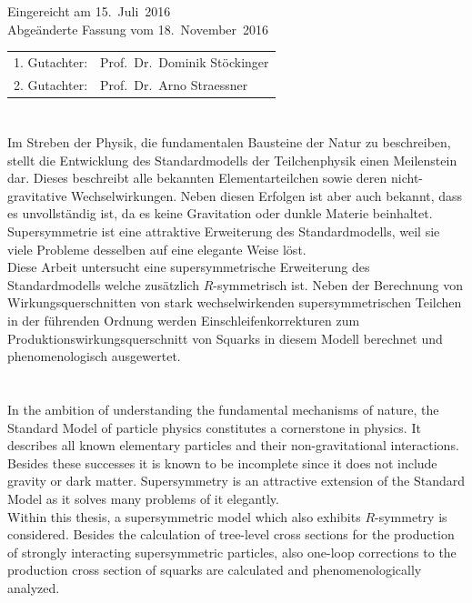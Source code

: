 \thispagestyle{empty}\vspace*{48em}
Eingereicht am 15.~Juli~2016\\
Abgeänderte Fassung vom 18.~November~2016\vspace{1.5em}
\par{\large\begin{tabular}{ll}
 1. Gutachter: & Prof.~Dr.~Dominik Stöckinger \\
 2. Gutachter: & Prof.~Dr.~Arno Straessner \\
\end{tabular}}
\newpage

\thispagestyle{empty}
\cleardoublepage

\section*{}
Im Streben der Physik, die fundamentalen Bausteine der Natur zu beschreiben, stellt die Ent\-wicklung des Standardmodells der Teilchenphysik einen Meilenstein dar. Dieses beschreibt alle bekannten Elementarteilchen sowie deren nicht-gravitative Wechselwirkungen. Neben diesen Erfolgen ist aber auch bekannt, dass es unvollständig ist, da es keine Gravitation oder dunkle Materie beinhaltet. Supersymmetrie ist eine attraktive Erweiterung des Standardmodells, weil sie viele Probleme desselben auf eine elegante Weise löst.\\
Diese Arbeit untersucht eine supersymmetrische Erweiterung des Standardmodells welche zusätzlich $R$-symmetrisch ist. Neben der Berechnung von Wirkungsquerschnitten von stark wechselwirkenden supersymmetrischen Teilchen in der führenden Ordnung werden Einschleifen\-korrekturen zum Produktionswirkungsquerschnitt von Squarks in diesem Modell berechnet und phenomenologisch ausgewertet.
\vspace{10em}
\section*{}
In the ambition of understanding the fundamental mechanisms of nature, the Standard Model of particle physics constitutes a cornerstone in physics. It describes all known elementary particles and their non-gravitational interactions. Besides these successes it is known to be incomplete since it does not include gravity or dark matter. Supersymmetry is an attractive extension of the Standard Model as it solves many problems of it elegantly.\\
Within this thesis, a supersymmetric model which also exhibits $R$-symmetry is considered. Besides the calculation of tree-level cross sections for the production of strongly interacting supersymmetric particles, also one-loop corrections to the production cross section of squarks are calculated and phenomenologically analyzed.
\newpage

